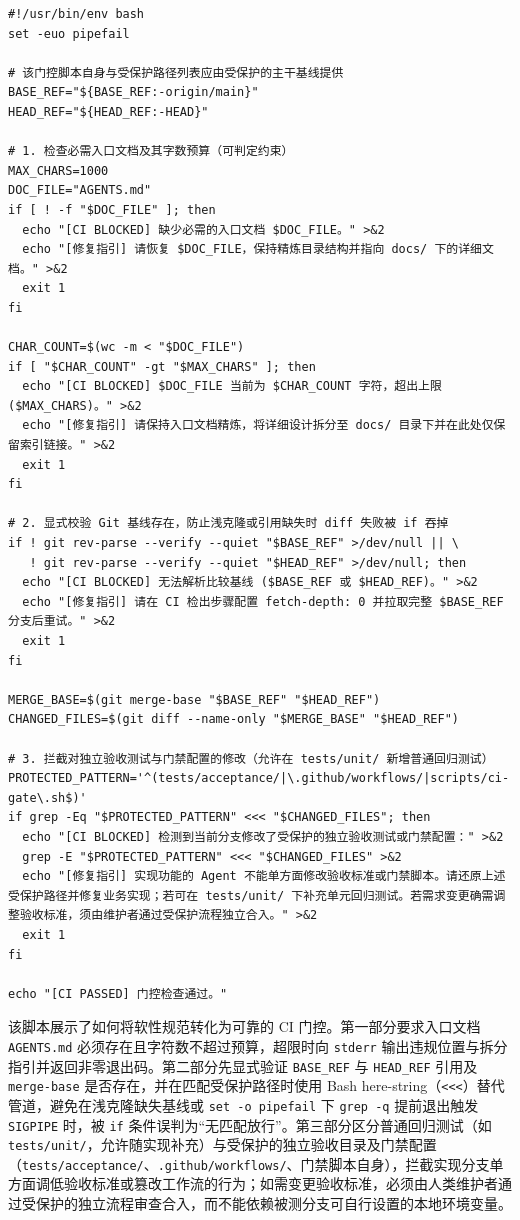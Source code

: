 \documentclass[UTF8,a4paper,11pt,fontset=fandol]{ctexart}
\begin{document}
\begin{lstlisting}[basicstyle={\ttfamily\small\linespread{1}\selectfont},captionpos=t,caption={带修复指引的文档预算与测试保护门控脚本示例}]
#!/usr/bin/env bash
set -euo pipefail

# 该门控脚本自身与受保护路径列表应由受保护的主干基线提供
BASE_REF="${BASE_REF:-origin/main}"
HEAD_REF="${HEAD_REF:-HEAD}"

# 1. 检查必需入口文档及其字数预算（可判定约束）
MAX_CHARS=1000
DOC_FILE="AGENTS.md"
if [ ! -f "$DOC_FILE" ]; then
  echo "[CI BLOCKED] 缺少必需的入口文档 $DOC_FILE。" >&2
  echo "[修复指引] 请恢复 $DOC_FILE，保持精炼目录结构并指向 docs/ 下的详细文档。" >&2
  exit 1
fi

CHAR_COUNT=$(wc -m < "$DOC_FILE")
if [ "$CHAR_COUNT" -gt "$MAX_CHARS" ]; then
  echo "[CI BLOCKED] $DOC_FILE 当前为 $CHAR_COUNT 字符，超出上限 ($MAX_CHARS)。" >&2
  echo "[修复指引] 请保持入口文档精炼，将详细设计拆分至 docs/ 目录下并在此处仅保留索引链接。" >&2
  exit 1
fi

# 2. 显式校验 Git 基线存在，防止浅克隆或引用缺失时 diff 失败被 if 吞掉
if ! git rev-parse --verify --quiet "$BASE_REF" >/dev/null || \
   ! git rev-parse --verify --quiet "$HEAD_REF" >/dev/null; then
  echo "[CI BLOCKED] 无法解析比较基线 ($BASE_REF 或 $HEAD_REF)。" >&2
  echo "[修复指引] 请在 CI 检出步骤配置 fetch-depth: 0 并拉取完整 $BASE_REF 分支后重试。" >&2
  exit 1
fi

MERGE_BASE=$(git merge-base "$BASE_REF" "$HEAD_REF")
CHANGED_FILES=$(git diff --name-only "$MERGE_BASE" "$HEAD_REF")

# 3. 拦截对独立验收测试与门禁配置的修改（允许在 tests/unit/ 新增普通回归测试）
PROTECTED_PATTERN='^(tests/acceptance/|\.github/workflows/|scripts/ci-gate\.sh$)'
if grep -Eq "$PROTECTED_PATTERN" <<< "$CHANGED_FILES"; then
  echo "[CI BLOCKED] 检测到当前分支修改了受保护的独立验收测试或门禁配置：" >&2
  grep -E "$PROTECTED_PATTERN" <<< "$CHANGED_FILES" >&2
  echo "[修复指引] 实现功能的 Agent 不能单方面修改验收标准或门禁脚本。请还原上述受保护路径并修复业务实现；若可在 tests/unit/ 下补充单元回归测试。若需求变更确需调整验收标准，须由维护者通过受保护流程独立合入。" >&2
  exit 1
fi

echo "[CI PASSED] 门控检查通过。"
\end{lstlisting}

该脚本展示了如何将软性规范转化为可靠的 CI 门控。第一部分要求入口文档 \texttt{AGENTS.md} 必须存在且字符数不超过预算，超限时向 \texttt{stderr} 输出违规位置与拆分指引并返回非零退出码。第二部分先显式验证 \texttt{BASE\_REF} 与 \texttt{HEAD\_REF} 引用及 \texttt{merge-base} 是否存在，并在匹配受保护路径时使用 Bash here-string（\texttt{<<<}）替代管道，避免在浅克隆缺失基线或 \texttt{set -o pipefail} 下 \texttt{grep -q} 提前退出触发 \texttt{SIGPIPE} 时，被 \texttt{if} 条件误判为“无匹配放行”。第三部分区分普通回归测试（如 \texttt{tests/unit/}，允许随实现补充）与受保护的独立验收目录及门禁配置（\texttt{tests/acceptance/}、\texttt{.github/workflows/}、门禁脚本自身），拦截实现分支单方面调低验收标准或篡改工作流的行为；如需变更验收标准，必须由人类维护者通过受保护的独立流程审查合入，而不能依赖被测分支可自行设置的本地环境变量。
\end{document}
